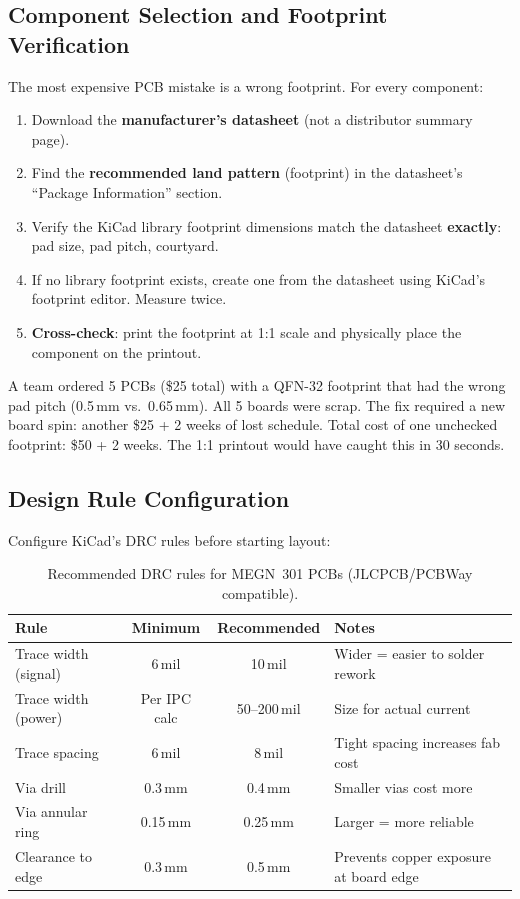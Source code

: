 \documentclass[11pt,letterpaper,twoside,openany]{book}
\begin{document}
\subsection{Component Selection and Footprint Verification}
The most expensive PCB mistake is a wrong footprint. For every component:
\begin{enumerate}[nosep,leftmargin=1.5em]
\item Download the \textbf{manufacturer's datasheet} (not a distributor summary page).
\item Find the \textbf{recommended land pattern} (footprint) in the datasheet's ``Package Information'' section.
\item Verify the KiCad library footprint dimensions match the datasheet \textbf{exactly}: pad size, pad pitch, courtyard.
\item If no library footprint exists, create one from the datasheet using KiCad's footprint editor. Measure twice.
\item \textbf{Cross-check}: print the footprint at 1:1 scale and physically place the component on the printout.
\end{enumerate}

\begin{warningbox}
A team ordered 5 PCBs (\$25 total) with a QFN-32 footprint that had the wrong pad pitch (0.5\,mm vs.\ 0.65\,mm). All 5 boards were scrap. The fix required a new board spin: another \$25 + 2 weeks of lost schedule. Total cost of one unchecked footprint: \$50 + 2 weeks. The 1:1 printout would have caught this in 30 seconds.
\end{warningbox}

\subsection{Design Rule Configuration}
Configure KiCad's DRC rules before starting layout:
\begin{table}[htbp]\centering\small
\begin{tabularx}{\textwidth}{l c c X}
\toprule
\textbf{Rule} & \textbf{Minimum} & \textbf{Recommended} & \textbf{Notes} \\
\midrule
Trace width (signal) & 6\,mil & 10\,mil & Wider = easier to solder rework \\
Trace width (power) & Per IPC calc & 50--200\,mil & Size for actual current \\
Trace spacing & 6\,mil & 8\,mil & Tight spacing increases fab cost \\
Via drill & 0.3\,mm & 0.4\,mm & Smaller vias cost more \\
Via annular ring & 0.15\,mm & 0.25\,mm & Larger = more reliable \\
Clearance to edge & 0.3\,mm & 0.5\,mm & Prevents copper exposure at board edge \\
\bottomrule
\end{tabularx}
\caption{Recommended DRC rules for MEGN~301 PCBs (JLCPCB/PCBWay compatible).}
\end{table}
\end{document}
